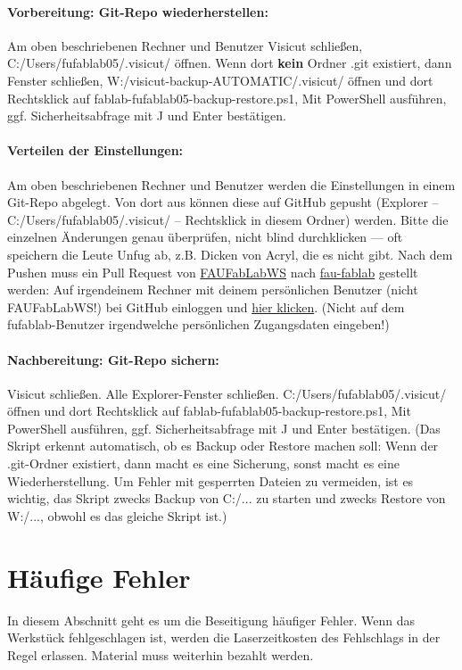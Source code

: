 \documentclass{\basedir/fablab-document}
\begin{document}
	\paragraph{Vorbereitung: Git-Repo wiederherstellen:} Am oben beschriebenen Rechner und Benutzer Visicut schließen, C:/Users/fufablab05/.visicut/ öffnen. Wenn dort \textbf{kein} Ordner .git existiert, dann Fenster schließen, W:/visicut-backup-AUTOMATIC/.visicut/ öffnen und dort Rechtsklick auf fablab-fufablab05-backup-restore.ps1, Mit PowerShell ausführen, ggf. Sicherheitsabfrage mit J und Enter bestätigen.

	\paragraph{Verteilen der Einstellungen:}
	Am oben beschriebenen Rechner und Benutzer werden die Einstellungen in einem Git-Repo abgelegt.
	Von dort aus können diese auf GitHub gepusht (Explorer -- C:/Users/fufablab05/.visicut/ -- Rechtsklick in diesem Ordner) werden. Bitte die einzelnen Änderungen genau überprüfen, nicht blind durchklicken --- oft speichern die Leute Unfug ab, z.B. Dicken von Acryl, die es nicht gibt. Nach dem Pushen muss ein Pull Request von \href{https://github.com/FAUFabLabWS/visicut-settings}{FAUFabLabWS} nach \href{https://github.com/fau-fablab/visicut-settings}{fau-fablab} gestellt werden: Auf irgendeinem Rechner mit deinem persönlichen Benutzer (nicht FAUFabLabWS!) bei GitHub einloggen und \href{https://github.com/fau-fablab/visicut-settings/compare/master...FAUFabLabWS:master}{hier klicken}. (Nicht auf dem fufablab-Benutzer irgendwelche persönlichen Zugangsdaten eingeben!)

	\paragraph{Nachbereitung: Git-Repo sichern:} Visicut schließen. Alle Explorer-Fenster schließen. C:/Users/fufablab05/.visicut/ öffnen und dort Rechtsklick auf fablab-fufablab05-backup-restore.ps1, Mit PowerShell ausführen, ggf. Sicherheitsabfrage mit J und Enter bestätigen. (Das Skript erkennt automatisch, ob es Backup oder Restore machen soll: Wenn der .git-Ordner existiert, dann macht es eine Sicherung, sonst macht es eine Wiederherstellung. Um Fehler mit gesperrten Dateien zu vermeiden, ist es wichtig, das Skript zwecks Backup von C:/... zu starten und zwecks Restore von W:/..., obwohl es das gleiche Skript ist.)

	\section{Häufige Fehler}
	\label{sec:fehler-allgemein}
	In diesem Abschnitt geht es um die Beseitigung häufiger Fehler. Wenn das Werkstück fehlgeschlagen ist, werden die Laserzeitkosten des Fehlschlags in der Regel erlassen. Material muss weiterhin bezahlt werden.
\end{document}
